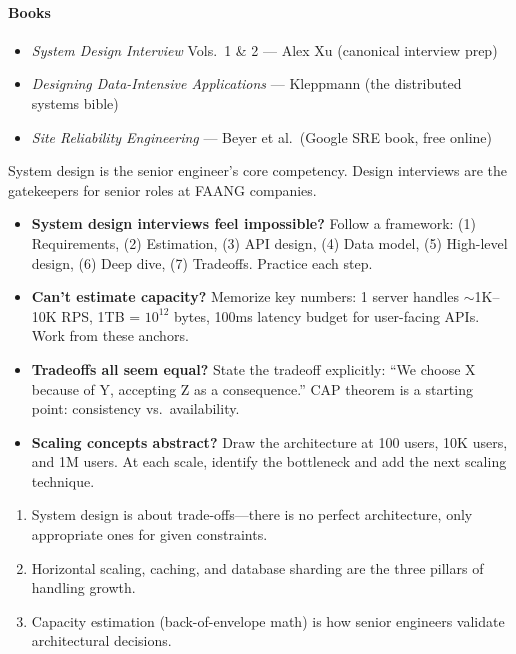 \documentclass[11pt, a4paper, oneside]{report}
\begin{document}
\paragraph{Books}
\begin{itemize}[leftmargin=*]
\item \emph{System Design Interview} Vols.\ 1 \& 2 --- Alex Xu (canonical interview prep)
\item \emph{Designing Data-Intensive Applications} --- Kleppmann (the distributed systems bible)
\item \emph{Site Reliability Engineering} --- Beyer et al.\ (Google SRE book, free online)
\end{itemize}


\begin{realworldbox}
System design is the senior engineer's core competency. Design interviews are the gatekeepers for senior roles at FAANG companies.
\end{realworldbox}


\begin{stuckbox}
\begin{itemize}[leftmargin=*]
\item \textbf{System design interviews feel impossible?} Follow a framework: (1) Requirements, (2) Estimation, (3) API design, (4) Data model, (5) High-level design, (6) Deep dive, (7) Tradeoffs. Practice each step.
\item \textbf{Can't estimate capacity?} Memorize key numbers: 1 server handles $\sim$1K--10K RPS, 1TB = $10^{12}$ bytes, 100ms latency budget for user-facing APIs. Work from these anchors.
\item \textbf{Tradeoffs all seem equal?} State the tradeoff explicitly: ``We choose X because of Y, accepting Z as a consequence.'' CAP theorem is a starting point: consistency vs.\ availability.
\item \textbf{Scaling concepts abstract?} Draw the architecture at 100 users, 10K users, and 1M users. At each scale, identify the bottleneck and add the next scaling technique.
\end{itemize}
\end{stuckbox}


\begin{takeawaybox}
\begin{enumerate}[leftmargin=*]
\item System design is about trade-offs---there is no perfect architecture, only appropriate ones for given constraints.
\item Horizontal scaling, caching, and database sharding are the three pillars of handling growth.
\item Capacity estimation (back-of-envelope math) is how senior engineers validate architectural decisions.
\end{enumerate}
\end{takeawaybox}
\end{document}
